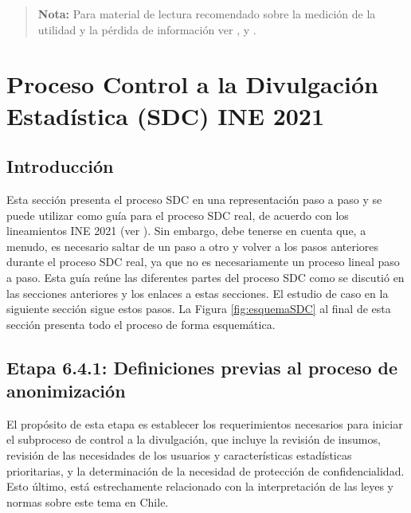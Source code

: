 \documentclass[]{book}
\theoremstyle{definition}
\theoremstyle{definition}
\theoremstyle{definition}
\theoremstyle{definition}
\theoremstyle{remark}
\begin{document}
\begin{quote}
\textbf{Nota:} Para material de lectura recomendado sobre la medición de la
utilidad y la pérdida de información ver \citep{dewaal1999}, \citep{domingo-ferrer2001} y \citep{domingo-ferrer2001}.
\end{quote}

\hypertarget{proceso-control-a-la-divulgaciuxf3n-estaduxedstica-sdc-ine-2021}{%
\chapter{Proceso Control a la Divulgación Estadística (SDC) INE 2021}\label{proceso-control-a-la-divulgaciuxf3n-estaduxedstica-sdc-ine-2021}}

\hypertarget{introducciuxf3n-2}{%
\section{Introducción}\label{introducciuxf3n-2}}

Esta sección presenta el proceso SDC en una representación paso a paso y se puede utilizar como guía para el proceso SDC real, de acuerdo con los lineamientos INE 2021 (ver \citep{ine2021}). Sin embargo, debe tenerse en cuenta que, a menudo, es necesario saltar de un paso a otro y volver a los pasos anteriores durante el proceso SDC real, ya que no es necesariamente un proceso lineal paso a paso. Esta guía reúne las diferentes partes del proceso SDC como se discutió en las secciones anteriores y los enlaces a estas secciones. El estudio de caso en la siguiente sección sigue estos pasos. La Figura \ref{fig:esquemaSDC} al final de esta sección presenta todo el proceso de forma esquemática.

\hypertarget{etapa-6.4.1-definiciones-previas-al-proceso-de-anonimizaciuxf3n}{%
\section{Etapa 6.4.1: Definiciones previas al proceso de anonimización}\label{etapa-6.4.1-definiciones-previas-al-proceso-de-anonimizaciuxf3n}}

El propósito de esta etapa es establecer los requerimientos necesarios para iniciar el subproceso de control a la divulgación, que incluye la revisión de insumos, revisión de las necesidades de los usuarios y características estadísticas prioritarias, y la determinación de la necesidad de protección de confidencialidad. Esto último, está estrechamente relacionado con la interpretación de las leyes y normas sobre este tema en Chile.
\end{document}
